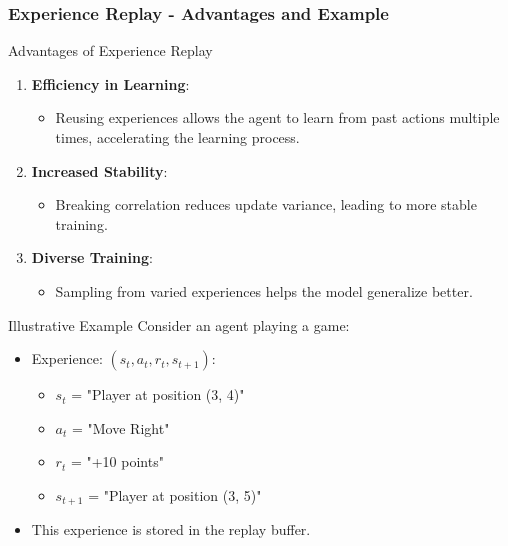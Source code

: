 \documentclass{beamer}
\begin{document}
\begin{frame}[fragile]
    \frametitle{Experience Replay - Advantages and Example}
    \begin{block}{Advantages of Experience Replay}
        \begin{enumerate}
            \item \textbf{Efficiency in Learning}:
            \begin{itemize}
                \item Reusing experiences allows the agent to learn from past actions multiple times, accelerating the learning process.
            \end{itemize}
            
            \item \textbf{Increased Stability}:
            \begin{itemize}
                \item Breaking correlation reduces update variance, leading to more stable training.
            \end{itemize}
            
            \item \textbf{Diverse Training}:
            \begin{itemize}
                \item Sampling from varied experiences helps the model generalize better.
            \end{itemize}
        \end{enumerate}
    \end{block}

    \begin{block}{Illustrative Example}
        Consider an agent playing a game:
        \begin{itemize}
            \item Experience: 
            \((s_t, a_t, r_t, s_{t+1})\): 
            \begin{itemize}
                \item \(s_t\) = "Player at position (3, 4)"
                \item \(a_t\) = "Move Right"
                \item \(r_t\) = "+10 points"
                \item \(s_{t+1}\) = "Player at position (3, 5)"
            \end{itemize}
            \item This experience is stored in the replay buffer.
        \end{itemize}
    \end{block}
\end{frame}
\end{document}

